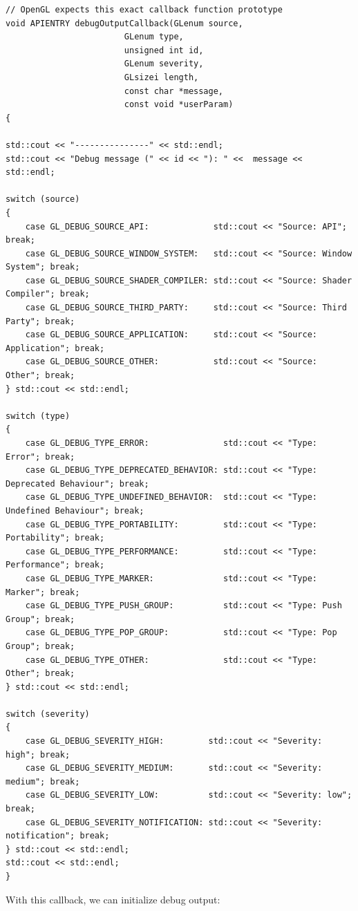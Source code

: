 \documentclass[table, xcdraw]{article}%
\begin{document}
\begin{verbatim}
// OpenGL expects this exact callback function prototype
void APIENTRY debugOutputCallback(GLenum source, 
                        GLenum type, 
                        unsigned int id, 
                        GLenum severity, 
                        GLsizei length, 
                        const char *message, 
                        const void *userParam)
{

std::cout << "---------------" << std::endl;
std::cout << "Debug message (" << id << "): " <<  message << std::endl;

switch (source)
{
    case GL_DEBUG_SOURCE_API:             std::cout << "Source: API"; break;
    case GL_DEBUG_SOURCE_WINDOW_SYSTEM:   std::cout << "Source: Window System"; break;
    case GL_DEBUG_SOURCE_SHADER_COMPILER: std::cout << "Source: Shader Compiler"; break;
    case GL_DEBUG_SOURCE_THIRD_PARTY:     std::cout << "Source: Third Party"; break;
    case GL_DEBUG_SOURCE_APPLICATION:     std::cout << "Source: Application"; break;
    case GL_DEBUG_SOURCE_OTHER:           std::cout << "Source: Other"; break;
} std::cout << std::endl;

switch (type)
{
    case GL_DEBUG_TYPE_ERROR:               std::cout << "Type: Error"; break;
    case GL_DEBUG_TYPE_DEPRECATED_BEHAVIOR: std::cout << "Type: Deprecated Behaviour"; break;
    case GL_DEBUG_TYPE_UNDEFINED_BEHAVIOR:  std::cout << "Type: Undefined Behaviour"; break; 
    case GL_DEBUG_TYPE_PORTABILITY:         std::cout << "Type: Portability"; break;
    case GL_DEBUG_TYPE_PERFORMANCE:         std::cout << "Type: Performance"; break;
    case GL_DEBUG_TYPE_MARKER:              std::cout << "Type: Marker"; break;
    case GL_DEBUG_TYPE_PUSH_GROUP:          std::cout << "Type: Push Group"; break;
    case GL_DEBUG_TYPE_POP_GROUP:           std::cout << "Type: Pop Group"; break;
    case GL_DEBUG_TYPE_OTHER:               std::cout << "Type: Other"; break;
} std::cout << std::endl;

switch (severity)
{
    case GL_DEBUG_SEVERITY_HIGH:         std::cout << "Severity: high"; break;
    case GL_DEBUG_SEVERITY_MEDIUM:       std::cout << "Severity: medium"; break;
    case GL_DEBUG_SEVERITY_LOW:          std::cout << "Severity: low"; break;
    case GL_DEBUG_SEVERITY_NOTIFICATION: std::cout << "Severity: notification"; break;
} std::cout << std::endl;
std::cout << std::endl;
}
\end{verbatim}

With this callback, we can initialize debug output:
\end{document}
